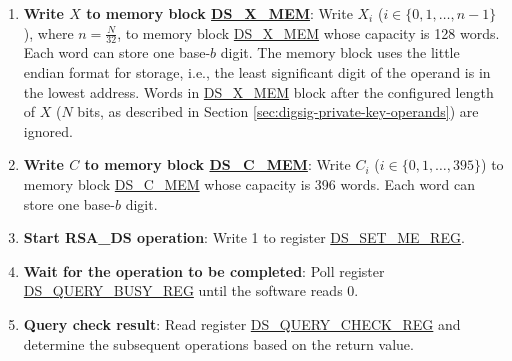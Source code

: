 \documentclass[main\_\_EN.tex]{subfiles}
\begin{document}
\begin{enumerate}
    \item {\bfseries Write \begin{math}X\end{math} to memory block \hyperref[DSXMEM]{DS\_X\_MEM}}: Write \begin{math}X_{i}\end{math}
        (\begin{math}i \in \{ 0, 1, \dots, n-1 \} \end{math}), where \begin{math} n = \frac{N}{32} \end{math}, to memory block \hyperref[DSXMEM]{DS\_X\_MEM} whose capacity is 128 words. Each word can store one base-\begin{math}b\end{math} digit. The memory block uses the little endian format for storage, i.e., the least significant digit of the operand is in the lowest address. Words in \hyperref[DSXMEM]{DS\_X\_MEM} block after the configured length of \begin{math}X\end{math} (\begin{math}N\end{math} bits, as described in Section \ref{sec:digsig-private-key-operands}) are ignored.

    \item {\bfseries Write \begin{math}C\end{math} to memory block \hyperref[DSCMEM]{DS\_C\_MEM}}: Write \begin{math}C_{i}\end{math}
        (\begin{math}i \in \{ 0, 1, \dots, 395 \} \end{math})
        to memory block \hyperref[DSCMEM]{DS\_C\_MEM} whose capacity is 396 words. Each word can store one base-\begin{math}b\end{math} digit.


    \item {\bfseries Start RSA\_DS operation}: Write 1 to register \hyperref[regdesc:DSSETMEREG]{DS\_SET\_ME\_REG}.

    \item {\bfseries Wait for the operation to be completed}: Poll register \hyperref[regdesc:DSQUERYBUSYREG]{DS\_QUERY\_BUSY\_REG} until the software reads 0.

    \item {\bfseries Query check result}: Read register \hyperref[regdesc:DSQUERYCHECKREG]{DS\_QUERY\_CHECK\_REG} and determine the subsequent operations based on the return value.


\end{enumerate}
\end{document}
